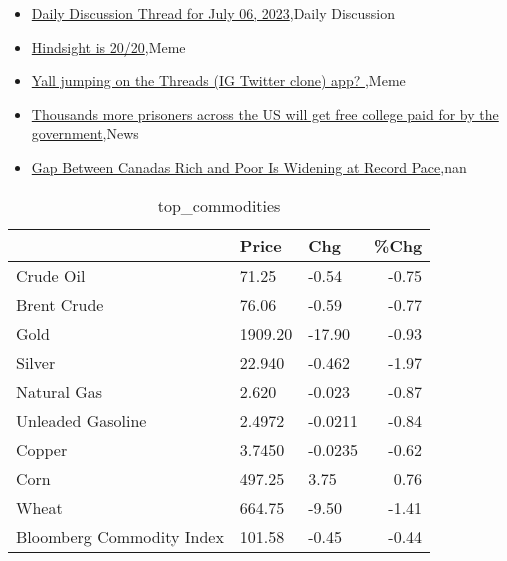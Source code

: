 \documentclass{article}%
\begin{document}
%
\begin{itemize}%
\item%
\href{https://reddit.com/r/wallstreetbets/comments/14s4hjt/daily\_discussion\_thread\_for\_july\_06\_2023/}{Daily Discussion Thread for July 06, 2023},Daily Discussion%
\item%
\href{https://reddit.com/r/wallstreetbets/comments/14s2hrr/hindsight\_is\_2020/}{Hindsight is 20/20},Meme%
\item%
\href{https://reddit.com/r/StockMarket/comments/14s00c7/yall\_jumping\_on\_the\_threads\_ig\_twitter\_clone\_app/}{Yall jumping on the Threads (IG Twitter clone) app? },Meme%
\item%
\href{https://reddit.com/r/Economics/comments/14rzeyk/thousands\_more\_prisoners\_across\_the\_us\_will\_get/}{Thousands more prisoners across the US will get free college paid for by the government},News%
\item%
\href{https://reddit.com/r/Economics/comments/14rs2ds/gap\_between\_canadas\_rich\_and\_poor\_is\_widening\_at/}{Gap Between Canadas Rich and Poor Is Widening at Record Pace},nan%
\end{itemize}%


\begin{table}[htbp]%
\caption{top\_commodities}%
\centering%
\begin{adjustbox}{width=1\textwidth}%
\begin{tabular}{lllr}
\toprule
                          &   Price &     Chg &  \%Chg \\
\midrule
               Crude Oil  &   71.25 &   -0.54 & -0.75 \\
             Brent Crude  &   76.06 &   -0.59 & -0.77 \\
                    Gold  & 1909.20 &  -17.90 & -0.93 \\
                  Silver  &  22.940 &  -0.462 & -1.97 \\
             Natural Gas  &   2.620 &  -0.023 & -0.87 \\
       Unleaded Gasoline  &  2.4972 & -0.0211 & -0.84 \\
                  Copper  &  3.7450 & -0.0235 & -0.62 \\
                    Corn  &  497.25 &    3.75 &  0.76 \\
                   Wheat  &  664.75 &   -9.50 & -1.41 \\
Bloomberg Commodity Index &  101.58 &   -0.45 & -0.44 \\
\bottomrule
\end{tabular}
%
\end{adjustbox}%
\end{table}
\end{document}

